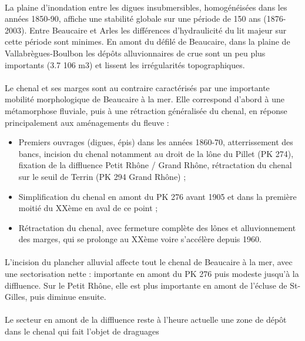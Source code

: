 \documentclass[11pt]{article}
\begin{document}
\paragraph{} La plaine d’inondation entre les digues insubmersibles, homogénéisées dans les années 1850-90, affiche une stabilité globale sur une période de 150 ans (1876-2003). Entre Beaucaire et Arles les différences d’hydraulicité du lit majeur sur cette période sont minimes. En amont du défilé de Beaucaire, dans la plaine de Vallabrègues-Boulbon les dépôts alluvionnaires de crue sont un peu plus importants (3.7 106 m3) et lissent les irrégularités topographiques.
\paragraph{}Le chenal et ses marges sont au contraire caractérisés par une importante mobilité morphologique de Beaucaire à la mer. Elle correspond d’abord à une métamorphose fluviale, puis à une rétraction généralisée du chenal, en réponse principalement aux aménagements du fleuve :
\begin{itemize}
	\item{}Premiers ouvrages (digues, épis) dans les années 1860-70, atterrissement des bancs, incision du chenal notamment au droit de la lône du Pillet (PK 274), fixation de la diffluence Petit Rhône / Grand Rhône, rétractation du chenal sur le seuil de Terrin (PK 294 Grand Rhône) ;
	\item{}Simplification du chenal en amont du PK 276 avant 1905 et dans la première moitié du XXème en aval de ce point ;
	\item{}Rétractation du chenal, avec fermeture complète des lônes et alluvionnement des marges, qui se prolonge au XXème voire s’accélère depuis 1960.
\end{itemize}

\paragraph{}L’incision du plancher alluvial affecte tout le chenal de Beaucaire à la mer, avec une sectorisation nette : importante en amont du PK 276 puis modeste jusqu’à la diffluence. Sur le Petit Rhône, elle est plus importante en amont de l’écluse de St-Gilles, puis diminue ensuite.

\paragraph{}Le secteur en amont de la diffluence reste à l’heure actuelle une zone de dépôt dans le chenal qui fait l’objet de draguages
\end{document}
